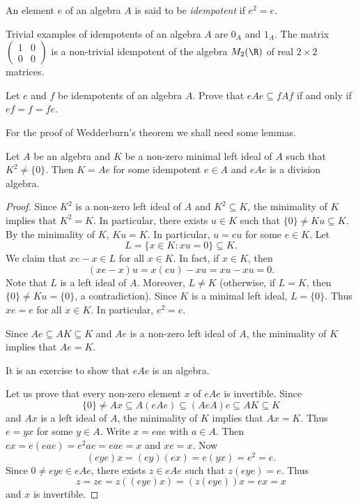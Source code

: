 \begin{definition}
    An element $e$ of an algebra $A$ is said to be 
    \emph{idempotent} if $e^2=e$. 
\end{definition}

Trivial examples of idempotents of an algebra $A$ 
are $0_A$ and $1_A$. The
matrix 
$\begin{pmatrix}1&0\\0&0\end{pmatrix}$ 
is a non-trivial idempotent of the algebra $M_2(\R)$ of real $2\times 2$ matrices. 

\begin{exercise}
    Let $e$ and $f$ be idempotents of an algebra $A$. 
    Prove that $eAe\subseteq fAf$ if and only if $ef=f=fe$.
\end{exercise}

For the proof of Wedderburn's theorem we shall need some lemmas. 

\begin{lemma}[Brauer]
\label{lem:Brauer}
Let $A$ be an algebra and $K$ be a non-zero 
minimal left ideal of $A$ such that $K^2\ne\{0\}$. 
Then $K=Ae$ for some idempotent $e\in A$ and
$eAe$ is a division algebra.
\end{lemma}

\begin{proof}
Since $K^2$ is a non-zero left ideal of $A$ and 
$K^2\subseteq K$, the minimality of $K$ implies that $K^2=K$. In particular, 
there exists $u\in K$ such that $\{0\}\ne Ku\subseteq K$. By the minimality of $K$, 
$Ku=K$. In particular, $u=eu$ for some $e\in K$. 
Let 
\[
L=\{x\in K:xu=0\}\subseteq K.
\] 
We claim that $xe-x\in L$ for all $x\in K$. In fact, 
if $x\in K$, then 
\[
(xe-x)u=x(eu)-xu=xu-xu=0.
\]
Note that $L$ is a left ideal of $A$. Moreover, $L\ne K$ (otherwise, 
if $L=K$, then $\{0\}\ne Ku=\{0\}$, a contradiction). 
Since $K$ is a minimal left ideal, 
$L=\{0\}$. Thus $xe=e$ for all $x\in K$. In particular, $e^2=e$. 

Since $Ae\subseteq AK\subseteq K$ and $Ae$ is a non-zero 
left ideal of $A$, 
the minimality of $K$ implies that $Ae=K$. 

It is an exercise to show that $eAe$ is an algebra. 

Let us prove
that every non-zero element $x$ of $eAe$ is invertible. Since  
\[
\{0\}\ne Ax\subseteq A(eAe)\subseteq (AeA)e\subseteq AK\subseteq K
\]
and $Ax$ is a left ideal of $A$, the minimality of $K$ implies that 
$Ax=K$. Thus $e=yx$ for some $y\in A$. Write $x=eae$ with $a\in A$. Then 
$ex=e(eae)=e^2ae=eae=x$ and 
$xe=x$. Now 
\[
(eye)x=(ey)(ex)=e(yx)=e^2=e.
\]
Since $0\ne eye\in eAe$, there exists $z\in eAe$ such that 
$z(eye)=e$. Thus 
\[
z=ze=z((eye)x)=(z(eye))x=ex=x
\]
and $x$ is invertible. 
\end{proof}

